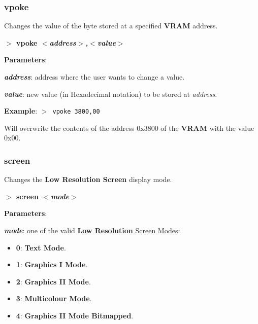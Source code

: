 \documentclass[a4paper,11pt]{article}
\begin{document}
        \subsubsection{{\color{blue}vpoke}}
        Changes the value of the byte stored at a specified \textbf{VRAM}
        address.

        \hspace{1.9cm}\textbf{$>$ vpoke \textit{$<$address$>$,$<$value$>$}}

        \textbf{Parameters}:

        \hspace{1cm}\textbf{\textit{address}}: address where the user wants
        to change a value.
        
        \hspace{1cm}\textbf{\textit{value}}: new value (in Hexadecimal notation)
        to be stored at \textit{address}.

        \textbf{Example}: \texttt{$>$ vpoke 3800,00}

        Will overwrite the contents of the address 0x3800 of the \textbf{VRAM}
        with the value 0x00.

        \subsubsection{{\color{blue}screen}}
        Changes the \textbf{Low Resolution Screen} display mode.

        \hspace{1.9cm}\textbf{$>$ screen \textit{$<$mode$>$}}

        \textbf{Parameters}:

        \hspace{1cm}\textbf{\textit{mode}}: one of the valid
        \hyperref[sec:vdpscrmodes]{\textbf{Low Resolution} Screen Modes}:

        \begin{itemize}
            \item \textbf{0}: \textbf{Text Mode}.
            \item \textbf{1}: \textbf{Graphics I Mode}.
            \item \textbf{2}: \textbf{Graphics II Mode}.
            \item \textbf{3}: \textbf{Multicolour Mode}.
            \item \textbf{4}: \textbf{Graphics II Mode Bitmapped}.
        \end{itemize}
        
\end{document}
